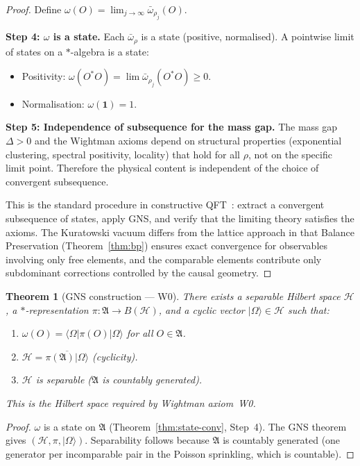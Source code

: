 \documentclass[11pt]{article}
\newtheorem{theorem}{Theorem}[section]
\newcommand{\hilb}{\mathscr{H}}
\begin{document}
\begin{proof}
Define $\omega(O) = \lim_{j \to \infty}
\bar{\omega}_{\rho_j}(O)$.

\textbf{Step 4: $\omega$ is a state.}
Each $\bar{\omega}_\rho$ is a state (positive, normalised).
A pointwise limit of states on a $*$-algebra is a state:
\begin{itemize}
\item Positivity: $\omega(O^* O) = \lim
  \bar{\omega}_{\rho_j}(O^* O) \ge 0$.
\item Normalisation: $\omega(\mathbf{1}) = 1$.
\end{itemize}

\textbf{Step 5: Independence of subsequence for the mass gap.}
The mass gap $\Delta > 0$ and the Wightman axioms depend on
structural properties (exponential clustering, spectral
positivity, locality) that hold for all $\rho$, not on the
specific limit point.  Therefore the physical content is
independent of the choice of convergent subsequence.

This is the standard procedure in constructive
QFT~\cite{GlimmJaffe}: extract a convergent subsequence of
states, apply GNS, and verify that the limiting theory
satisfies the axioms.  The Kuratowski vacuum differs from
the lattice approach in that Balance Preservation
(Theorem~\ref{thm:bp}) ensures exact convergence for
observables involving only free elements, and the
comparable elements contribute only subdominant corrections
controlled by the causal geometry.
\end{proof}

\begin{theorem}[GNS construction --- W0]
\label{thm:gns}
There exists a separable Hilbert space $\hilb$, a
$*$-representation $\pi : \mathfrak{A} \to B(\hilb)$, and
a cyclic vector $|\Omega\rangle \in \hilb$ such that:
\begin{enumerate}
\item[(a)] $\omega(O) = \langle\Omega | \pi(O) | \Omega\rangle$
  for all $O \in \mathfrak{A}$.
\item[(b)] $\hilb = \overline{\pi(\mathfrak{A}) |\Omega\rangle}$
  (cyclicity).
\item[(c)] $\hilb$ is separable ($\mathfrak{A}$ is countably
  generated).
\end{enumerate}
This is the Hilbert space required by Wightman axiom~W0.
\end{theorem}

\begin{proof}
$\omega$ is a state on $\mathfrak{A}$
(Theorem~\ref{thm:state-conv}, Step~4).
The GNS theorem~\cite{GNS} gives $(\hilb, \pi, |\Omega\rangle)$.
Separability follows because $\mathfrak{A}$ is countably
generated (one generator per incomparable pair in the
Poisson sprinkling, which is countable).
\end{proof}
\end{document}
